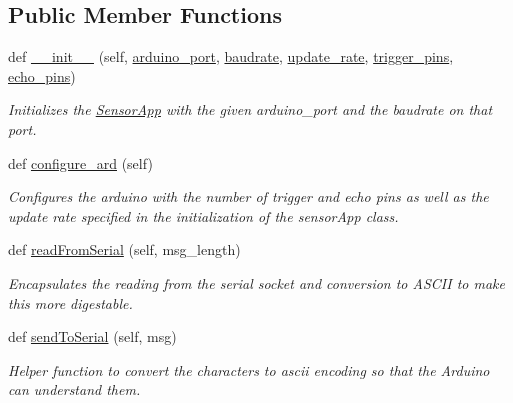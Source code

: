 \subsection*{Public Member Functions}
\begin{DoxyCompactItemize}
\item 
def \mbox{\hyperlink{classsensor_app_1_1_sensor_app_aff4d4ec9b68e6bd9953992bca3c3ea3d}{\+\_\+\+\_\+init\+\_\+\+\_\+}} (self, \mbox{\hyperlink{classsensor_app_1_1_sensor_app_a1c6f7cac80d19d5870ff22738732fdf4}{arduino\+\_\+port}}, \mbox{\hyperlink{classsensor_app_1_1_sensor_app_ae2475f8d81d862dd64aff6f9a6a76662}{baudrate}}, \mbox{\hyperlink{classsensor_app_1_1_sensor_app_a5f53e6fffcb4e1aedf99d6d73d3f4d51}{update\+\_\+rate}}, \mbox{\hyperlink{classsensor_app_1_1_sensor_app_a6d9216a1f62c4f9d6502ac876601d687}{trigger\+\_\+pins}}, \mbox{\hyperlink{classsensor_app_1_1_sensor_app_a77ad47b625b026d193a7b5e614a5703c}{echo\+\_\+pins}})
\begin{DoxyCompactList}\small\item\em Initializes the \mbox{\hyperlink{classsensor_app_1_1_sensor_app}{Sensor\+App}} with the given arduino\+\_\+port and the baudrate on that port. \end{DoxyCompactList}\item 
def \mbox{\hyperlink{classsensor_app_1_1_sensor_app_a26bc47736a7df7fb5c0b946be1963c47}{configure\+\_\+ard}} (self)
\begin{DoxyCompactList}\small\item\em Configures the arduino with the number of trigger and echo pins as well as the update rate specified in the initialization of the sensor\+App class. \end{DoxyCompactList}\item 
def \mbox{\hyperlink{classsensor_app_1_1_sensor_app_a23ea17545530a32aaf5c4b949b20dc9f}{read\+From\+Serial}} (self, msg\+\_\+length)
\begin{DoxyCompactList}\small\item\em Encapsulates the reading from the serial socket and conversion to A\+S\+C\+II to make this more digestable. \end{DoxyCompactList}\item 
def \mbox{\hyperlink{classsensor_app_1_1_sensor_app_aca850979049ee038baa71e599b4a2d12}{send\+To\+Serial}} (self, msg)
\begin{DoxyCompactList}\small\item\em Helper function to convert the characters to ascii encoding so that the Arduino can understand them. \end{DoxyCompactList}\item 

\end{DoxyCompactItemize}
